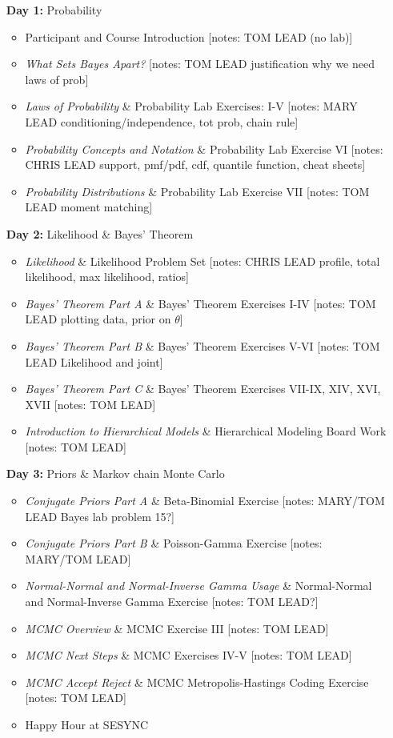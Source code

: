 \documentclass[11pt]{article}
\begin{document}
\begin{enumerate}
\item[\textbf{Day 1:}] Probability

\begin{itemize}
\item Participant and Course Introduction [notes: TOM LEAD (no lab)]
\item \emph{What Sets Bayes Apart?} [notes: TOM LEAD justification why we need laws of prob]
\item \emph{Laws of Probability} \& Probability Lab Exercises: I-V [notes: MARY LEAD conditioning/independence, tot prob, chain rule]
\item \emph{Probability Concepts and Notation} \& Probability Lab Exercise VI [notes: CHRIS LEAD support, pmf/pdf, cdf, quantile function, cheat sheets]
\item \emph{Probability Distributions}  \& Probability Lab Exercise VII [notes: TOM LEAD moment matching]
\end{itemize}

\item[\textbf{Day 2:}] Likelihood \& Bayes' Theorem

\begin{itemize}
\item \emph{Likelihood} \& Likelihood Problem Set [notes: CHRIS LEAD profile, total likelihood, max likelihood, ratios]
\item \emph{Bayes' Theorem Part A} \& Bayes' Theorem Exercises I-IV [notes: TOM LEAD plotting data, prior on $\theta$]
\item \emph{Bayes' Theorem Part B} \& Bayes' Theorem Exercises  V-VI [notes: TOM LEAD Likelihood and joint]
\item \emph{Bayes' Theorem Part C} \& Bayes' Theorem Exercises VII-IX, XIV, XVI, XVII [notes: TOM LEAD]
\item \emph{Introduction to Hierarchical Models} \& Hierarchical Modeling Board Work [notes: TOM LEAD]
\end{itemize}


\item[\textbf{Day 3:}] Priors \& Markov chain Monte Carlo

\begin{itemize}
\item \emph{Conjugate Priors Part A} \& Beta-Binomial Exercise [notes: MARY/TOM LEAD Bayes lab problem 15?]
\item \emph{Conjugate Priors Part B} \& Poisson-Gamma Exercise [notes: MARY/TOM LEAD] 
\item \emph{Normal-Normal and Normal-Inverse Gamma Usage} \& Normal-Normal and Normal-Inverse Gamma Exercise [notes: TOM LEAD?] 
\item \emph{MCMC Overview} \& MCMC Exercise III [notes: TOM LEAD] 
\item \emph{MCMC Next Steps} \& MCMC Exercises IV-V [notes: TOM LEAD] 
\item \emph{MCMC Accept Reject} \& MCMC Metropolis-Hastings Coding Exercise [notes: TOM LEAD]
\item Happy Hour at SESYNC 
\end{itemize}


\end{enumerate}
\end{document}
